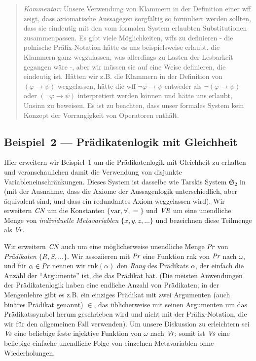 {\footnotesize\begin{quotation}
{\em Kommentar:} Unsere Verwendung von Klammern in der Definition einer wff zeigt, dass axiomatische Aussagegen sorgfältig so formuliert werden sollten, dass sie eindeutig mit den vom formalen System erlaubten Substitutionen zusammenpassen. Es gibt viele Möglichkeiten, wffs zu definieren - die polnische Präfix-Notation hätte es uns beispielsweise erlaubt, die Klammern ganz wegzulassen, was allerdings zu Lasten der Lesbarkeit gegangen wäre -, aber wir müssen sie auf eine Weise definieren, die eindeutig ist.  Hätten wir z.B. die Klammern in der Definition von $(\varphi\to \psi)$ weggelassen, hätte die wff $\lnot\varphi\to \psi$ entweder als $\lnot(\varphi\to\psi)$ oder $(\lnot\varphi\to\psi)$ interpretiert werden können und hätte uns erlaubt, Unsinn zu beweisen.  Es ist zu beachten, dass unser formales System kein Konzept der Vorrangigkeit von Operatoren enthält.
\end{quotation}}

\begin{sloppy}
\subsection{Beispiel~2 --- Prädikatenlogik mit Gleichheit}
\end{sloppy}

Hier erweitern wir Beispiel~1 um die Prädikatenlogik mit Gleichheit zu erhalten und veranschaulichen damit die Verwendung von disjunkte Variableneinschränkungen.  Dieses System ist dasselbe wie Tarskis System $\mathfrak{S}_2$ in \cite{Tarski1965} (mit der Ausnahme, dass die Axiome der Aussagenlogik unterschiedlich, aber äquivalent sind, und dass ein redundantes Axiom weggelassen wird).  Wir erweitern $\mbox{\em CN}$ um die Konstanten $\{\mbox{var},\forall,=\}$ und $\mbox{\em VR}$ um eine unendliche Menge von {\em individuelle Metavariablen} $\{x,y,z,\ldots\}$ und bezeichnen diese Teilmenge als $\mbox{\em Vr}$. 

Wir erweitern $\mbox{\em CN}$ auch um eine möglicherweise unendliche Menge $\mbox{\em Pr}$ von {\em Prädikaten} $\{R,S,\ldots\}$.  Wir assoziieren mit $\mbox{\em Pr}$ eine Funktion $\mbox{rnk}$ von $\mbox{\em Pr}$ nach $\omega$, und für $\alpha\in \mbox{\em Pr}$ nennen wir $\mbox{rnk}(\alpha)$ den {\em Rang} des Prädikats $\alpha$, der einfach die Anzahl der "`Argumente"' ist, die das Prädikat hat.  (Die meisten Anwendungen der Prädikatenlogik haben eine endliche Anzahl von Prädikaten; in der Mengenlehre gibt es z.B. ein einziges Prädikat mit zwei Argumenten (auch binäres Prädikat genannt) $\in$, das üblicherweise mit seinen Argumenten um das Prädikatssymbol herum geschrieben wird und nicht mit der Präfix-Notation, die wir für den allgemeinen Fall verwenden).
Um unsere Diskussion zu erleichtern sei $\mbox{\em Vs}$ eine beliebige feste injektive Funktion von $\omega$ nach $\mbox{\em Vr}$; somit ist $\mbox{\em Vs}$ eine beliebige einfache unendliche Folge von einzelnen Metavariablen ohne Wiederholungen. 

